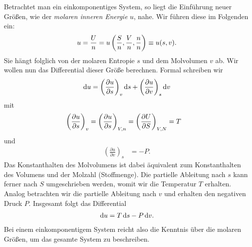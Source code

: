 Betrachtet man ein einkomponentiges System, so liegt die Einführung neuer Größen, wie der \emph{molaren inneren Energie} $u$, nahe. Wir führen diese im Folgenden ein:
\begin{align*}
    u=\frac{U}{n}=u\left(\frac{S}{n},\frac{V}{n},\frac{n}{n}\right)\equiv u(s,v).
\end{align*}
Sie hängt folglich von der molaren Entropie $s$ und dem Molvolumen $v$ ab.
Wir wollen nun das Differential dieser Größe berechnen. Formal schreiben wir
\begin{align*}
    \mathop{}\!\mathrm{d} u = \left(\frac{\partial u}{\partial s}\right)_v \mathop{}\!\mathrm{d} s + \left(\frac{\partial u}{\partial v}\right)_s\mathop{}\!\mathrm{d} v
\end{align*}
mit
\begin{align*}
    \left( \frac{\partial u}{\partial s} \right)_v=\left( \frac{\partial u}{\partial s} \right)_{V,n}&=\left( \frac{\partial U}{\partial S} \right)_{V,N} =T                                                             
\end{align*}
und 
\begin{align*}
    \left(\frac{\partial u}{\partial v}\right)_s   & = -P.       
\end{align*}
Das Konstanthalten des Molvolumens ist dabei äquivalent zum Konstanthalten des Volumens und der Molzahl (Stoffmenge). Die partielle Ableitung nach $s$ kann ferner nach $S$ umgeschrieben werden, womit wir die Temperatur $T$ erhalten.
Analog betrachten wir die partielle Ableitung nach $v$ und erhalten den negativen Druck $P$.
Insgesamt folgt das Differential
\begin{align*}
    \mathop{}\!\mathrm{d} u = T\mathop{}\!\mathrm{d} s -P\mathop{}\!\mathrm{d} v.
\end{align*}
Bei einem einkomponentigem System reicht also die Kenntnis über die molaren Größen, um das gesamte System zu beschreiben.

